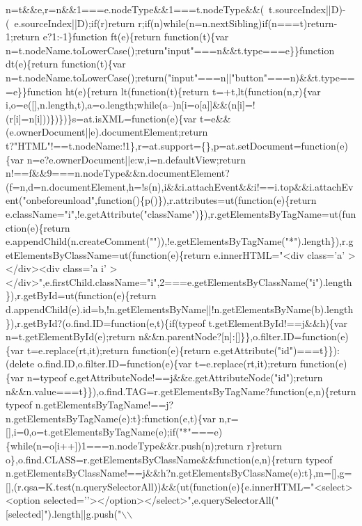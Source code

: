 \begin{DoxyCode}
{       n=t&&e,r=n&&1===e.nodeType&&1===t.nodeType&&(~t.sourceIndex||D)-(~e.sourceIndex||D);if(r)return r;if(n)while(n=n.nextSibling)if(n===t)return-1;return e?1:-1\}function
       ft(e)\{return function(t)\{var n=t.nodeName.toLowerCase();return"input"===n&&t.type===e\}\}function dt(e)\{return
       function(t)\{var n=t.nodeName.toLowerCase();return("input"===n||"button"===n)&&t.type===e\}\}function
       ht(e)\{return lt(function(t)\{return t=+t,lt(function(n,r)\{var
       i,o=e([],n.length,t),a=o.length;while(a--)n[i=o[a]]&&(n[i]=!(r[i]=n[i]))\})\})\}s=at.isXML=function(e)\{var t=e&&(e.ownerDocument||e).documentElement;return
       t?"HTML"!==t.nodeName:!1\},r=at.support=\{\},p=at.setDocument=function(e)\{var
       n=e?e.ownerDocument||e:w,i=n.defaultView;return
       n!==f&&9===n.nodeType&&n.documentElement?(f=n,d=n.documentElement,h=!s(n),i&&i.attachEvent&&i!==i.top&&i.attachEvent("onbeforeunload",function()\{p()\}),r.attributes=ut(function(e)\{return
       e.className="i",!e.getAttribute("className")\}),r.getElementsByTagName=ut(function(e)\{return
       e.appendChild(n.createComment("")),!e.getElementsByTagName("*").length\}),r.getElementsByClassName=ut(function(e)\{return e.innerHTML="<div class='}a\textcolor{stringliteral}{'
      ></div><div class='}a i\textcolor{stringliteral}{'
      ></div>",e.firstChild.className="i",2===e.getElementsByClassName("i").length\}),r.getById=ut(function(e)\{return
       d.appendChild(e).id=b,!n.getElementsByName||!n.getElementsByName(b).length\}),r.getById?(o.find.ID=function(e,t)\{if(typeof t.getElementById!==j&&h)\{var n=t.getElementById(e);return
       n&&n.parentNode?[n]:[]\}\},o.filter.ID=function(e)\{var t=e.replace(rt,it);return function(e)\{return
       e.getAttribute("id")===t\}\}):(delete o.find.ID,o.filter.ID=function(e)\{var t=e.replace(rt,it);return function(e)\{var n=typeof
       e.getAttributeNode!==j&&e.getAttributeNode("id");return
       n&&n.value===t\}\}),o.find.TAG=r.getElementsByTagName?function(e,n)\{return typeof n.getElementsByTagName!==j?n.getElementsByTagName(e):t\}:function(e,t)\{var
       n,r=[],i=0,o=t.getElementsByTagName(e);if("*"===e)\{while(n=o[i++])1===n.nodeType&&r.push(n);return r\}return
       o\},o.find.CLASS=r.getElementsByClassName&&function(e,n)\{return typeof
       n.getElementsByClassName!==j&&h?n.getElementsByClassName(e):t\},m=[],g=[],(r.qsa=K.test(n.querySelectorAll))&&(ut(function(e)\{e.innerHTML="<select><option
       selected='}\textcolor{stringliteral}{'></option></select>",e.querySelectorAll("[selected]").length||g.push("\(\backslash\)\(\backslash\)
}
\end{DoxyCode}
